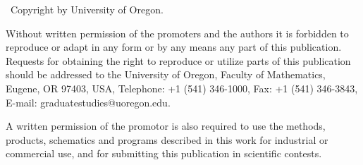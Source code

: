 \textcopyright~Copyright by University of Oregon.

Without written permission of the promoters and the authors it is forbidden to reproduce or adapt in any form or by any means any part of this publication. Requests for obtaining the right to reproduce or utilize parts of this publication should be addressed to the University of Oregon, Faculty of Mathematics, Eugene, OR 97403, USA, Telephone: +1 (541) 346-1000, Fax: +1 (541) 346-3843, E-mail: graduatestudies@uoregon.edu.

A written permission of the promotor is also required to use the methods, products, schematics and programs described in this work for industrial or commercial use, and for submitting this publication in scientific contests.
